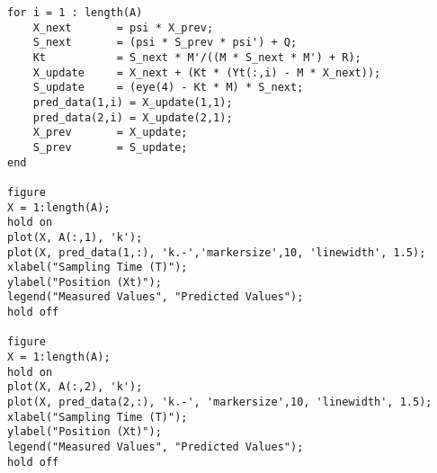 \documentclass[12pt]{article}
\begin{document}
\begin{verbatim}
for i = 1 : length(A)
    X_next       = psi * X_prev;
    S_next       = (psi * S_prev * psi') + Q;
    Kt           = S_next * M'/((M * S_next * M') + R);
    X_update     = X_next + (Kt * (Yt(:,i) - M * X_next));
    S_update     = (eye(4) - Kt * M) * S_next;
    pred_data(1,i) = X_update(1,1);
    pred_data(2,i) = X_update(2,1);
    X_prev       = X_update;
    S_prev       = S_update;
end 

figure
X = 1:length(A);
hold on
plot(X, A(:,1), 'k');
plot(X, pred_data(1,:), 'k.-','markersize',10, 'linewidth', 1.5);
xlabel("Sampling Time (T)");
ylabel("Position (Xt)");
legend("Measured Values", "Predicted Values");
hold off

figure
X = 1:length(A);
hold on
plot(X, A(:,2), 'k');
plot(X, pred_data(2,:), 'k.-', 'markersize',10, 'linewidth', 1.5);
xlabel("Sampling Time (T)");
ylabel("Position (Xt)");
legend("Measured Values", "Predicted Values");
hold off
\end{verbatim}
\end{document}
